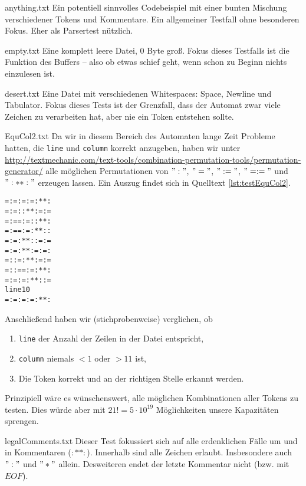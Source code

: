 \documentclass[
a4paper,   %
11pt,      %
oneside,   %
onecolumn, %
final      %
]{article}
\newcommand{\code}[1]{\lstinline$#1$}
\begin{document}
\begin{description}
\item{anything.txt} Ein potentiell sinnvolles Codebeispiel mit einer bunten Mischung verschiedener Tokens und Kommentare. Ein allgemeiner Testfall ohne besonderen Fokus. Eher als Parsertest nützlich.

\item{empty.txt} Eine komplett leere Datei, 0 Byte groß. Fokus dieses Testfalls ist die Funktion des Buffers -- also ob etwas schief geht, wenn schon zu Beginn nichts einzulesen ist.

\item{desert.txt} Eine Datei mit verschiedenen Whitespaces: Space, Newline und Tabulator. Fokus dieses Tests ist der Grenzfall, dass der Automat zwar viele Zeichen zu verarbeiten hat, aber nie ein Token entstehen sollte.

\item{EquCol2.txt} Da wir in diesem Bereich des Automaten lange Zeit Probleme hatten, die \code{line} und \code{column} korrekt anzugeben, haben wir unter \url{http://textmechanic.com/text-tools/combination-permutation-tools/permutation-generator/} alle möglichen Permutationen von $":"$, $"="$, $":="$, $"=:="$ und $":**:"$ erzeugen lassen. Ein Auszug findet sich in Quelltext \ref{lst:testEquCol2}.
\begin{lstlisting}[language=SysProgLang, caption={EquCol2.txt}, label=lst:testEquCol2]
=:=:=:=:**:
=:=::**:=:=
=:==:=::**:
=:==:=:**::
=:=:**::=:=
=:=:**:=:=:
=::=:**:=:=
=::==:=:**:
=:=:=:**::=
line10
=:=:=:=:**:
\end{lstlisting}
Anschließend haben wir (stichprobenweise) verglichen, ob
\begin{enumerate}
\item \code{line} der Anzahl der Zeilen in der Datei entspricht,
\item \code{column} niemals $< 1$ oder $> 11$ ist,
\item Die Token korrekt und an der richtigen Stelle erkannt werden.
\end{enumerate}
Prinzipiell wäre es wünschenswert, alle möglichen Kombinationen aller Tokens zu testen. Dies würde aber mit $21! = 5 \cdot 10^{19}$ Möglichkeiten unsere Kapazitäten sprengen.

\item{legalComments.txt} Dieser Test fokussiert sich auf alle erdenklichen Fälle um und in Kommentaren ($:* *:$). Innerhalb sind alle Zeichen erlaubt. Insbesondere auch $":"$ und $"*"$ allein. Desweiteren endet der letzte Kommentar nicht (bzw. mit $EOF$).


\end{description}
\end{document}
